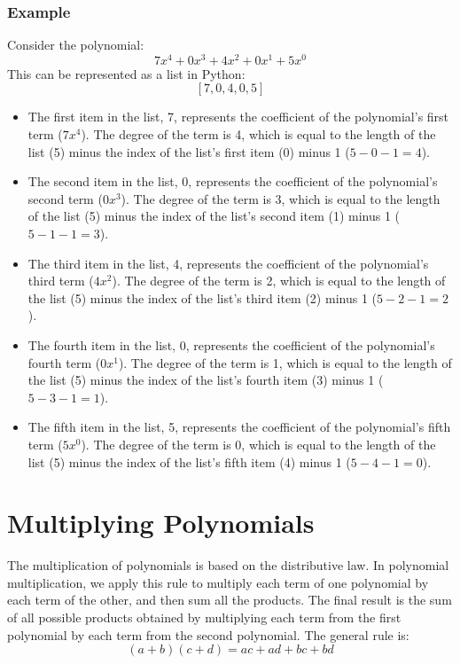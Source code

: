 \documentclass{article}
\begin{document}
\subsubsection*{Example}
Consider the polynomial:
$$ 7x^4 + 0x^3 + 4x^2 + 0x^1 + 5x^0 $$
This can be represented as a list in Python:
$$ [7, 0, 4, 0, 5] $$

\begin{itemize}
    \item The first item in the list, 7, represents the coefficient of the polynomial's first term (\( 7x^4 \)). The degree of the term is 4, which is equal to the length of the list (5) minus the index of the list's first item (0) minus 1 (\( 5 - 0 - 1 = 4 \)).
    \item The second item in the list, 0, represents the coefficient of the polynomial's second term (\( 0x^3 \)). The degree of the term is 3, which is equal to the length of the list (5) minus the index of the list's second item (1) minus 1 (\( 5 - 1 - 1 = 3 \)).
    \item The third item in the list, 4, represents the coefficient of the polynomial's third term (\( 4x^2 \)). The degree of the term is 2, which is equal to the length of the list (5) minus the index of the list's third item (2) minus 1 (\( 5 - 2 - 1 = 2 \)).
    \item The fourth item in the list, 0, represents the coefficient of the polynomial's fourth term (\( 0x^1 \)). The degree of the term is 1, which is equal to the length of the list (5) minus the index of the list's fourth item (3) minus 1 (\( 5 - 3 - 1 = 1 \)).
    \item The fifth item in the list, 5, represents the coefficient of the polynomial's fifth term (\( 5x^0 \)). The degree of the term is 0, which is equal to the length of the list (5) minus the index of the list's fifth item (4) minus 1 (\( 5 - 4 - 1 = 0 \)).
\end{itemize}

\section*{Multiplying Polynomials}

The multiplication of polynomials is based on the distributive law. In polynomial multiplication, we apply this rule to multiply each term of one polynomial by each term of the other, and then sum all the products. The final result is the sum of all possible products obtained by multiplying each term from the first polynomial by each term from the second polynomial. The general rule is:
$$ (a + b)(c + d) = ac + ad + bc + bd $$
\end{document}
